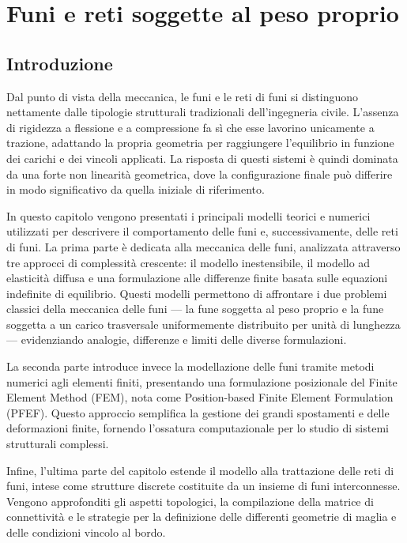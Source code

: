 \chapter{Funi e reti soggette al peso proprio}\label{chap:capitolo2}
\section{Introduzione}

Dal punto di vista della meccanica, le funi e le reti di funi si distinguono nettamente dalle tipologie strutturali tradizionali dell'ingegneria civile. L'assenza di rigidezza a flessione e a compressione fa sì che esse lavorino unicamente a trazione, adattando la propria geometria per raggiungere l'equilibrio in funzione dei carichi e dei vincoli applicati. La risposta di questi sistemi è quindi dominata da una forte non linearità geometrica, dove la configurazione finale può differire in modo significativo da quella iniziale di riferimento. 

In questo capitolo vengono presentati i principali modelli teorici e numerici utilizzati per descrivere il comportamento delle funi e, successivamente, delle reti di funi. La prima parte è dedicata alla meccanica delle funi, analizzata attraverso tre approcci di complessità crescente: il modello inestensibile, il modello ad elasticità diffusa e una formulazione alle differenze finite basata sulle equazioni indefinite di equilibrio. Questi modelli permettono di affrontare i due problemi classici della meccanica delle funi — la fune soggetta al peso proprio e la fune soggetta a un carico trasversale uniformemente distribuito per unità di lunghezza — evidenziando analogie, differenze e limiti delle diverse formulazioni.

La seconda parte introduce invece la modellazione delle funi tramite metodi numerici agli elementi finiti, presentando una formulazione posizionale del Finite Element Method (FEM), nota come Position-based Finite Element Formulation (PFEF). Questo approccio semplifica la gestione dei grandi spostamenti e delle deformazioni finite, fornendo l'ossatura computazionale per lo studio di sistemi strutturali complessi.

Infine, l'ultima parte del capitolo estende il modello alla trattazione delle reti di funi, intese come strutture discrete costituite da un insieme di funi interconnesse. Vengono approfonditi gli aspetti topologici, la compilazione della matrice di connettività e le strategie per la definizione delle differenti geometrie di maglia e delle condizioni vincolo al bordo.


